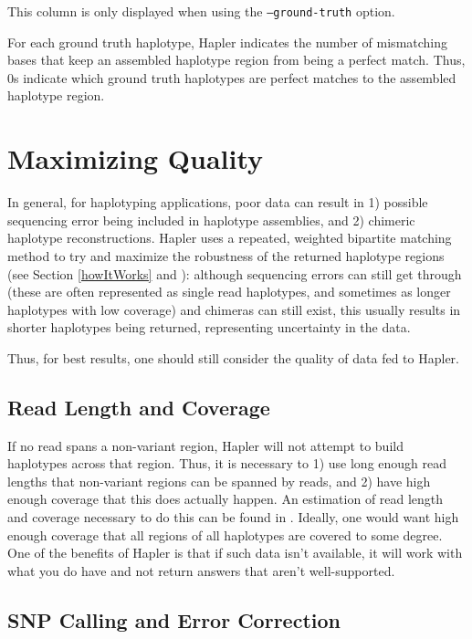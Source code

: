 \documentclass[11pt]{llncs}
\begin{document}
This column is only displayed when using the \texttt{--ground-truth} option.

For each ground truth haplotype, Hapler indicates the number of mismatching bases that keep an assembled haplotype region from being a perfect
match. Thus, 0s indicate which ground truth haplotypes are perfect matches to the assembled haplotype region.


\newpage
\section{Maximizing Quality}
\label{maximizingQuality}

In general, for haplotyping applications, poor data can result in 1) possible sequencing error being included in haplotype
assemblies, and 2) chimeric haplotype reconstructions. 
Hapler uses a repeated, weighted bipartite matching method to try and maximize the robustness of the returned haplotype regions (see Section 
\ref{howItWorks} and \cite{ONEIL2011}): although sequencing errors can still get through (these are often represented as single read 
haplotypes, and sometimes as longer haplotypes with low coverage) and chimeras can still exist, this usually results in shorter haplotypes being returned,
representing uncertainty in the data.

Thus, for best results, one should still consider the quality of data fed to Hapler.

\subsection{Read Length and Coverage}

If no read spans a non-variant region, Hapler will not attempt to build haplotypes across that region. Thus, it is necessary to 1) use long enough
read lengths that non-variant regions can be spanned by reads, and 2) have high enough coverage that this does actually happen. An estimation of 
read length and coverage necessary to do this can be found in \cite{ERIKSSON2008}. Ideally, one would want high enough coverage that all regions
of all haplotypes are covered to some degree. One of the benefits of Hapler is that if such data isn't available, it will work with what you do have
and not return answers that aren't well-supported.

\subsection{SNP Calling and Error Correction}
\end{document}

